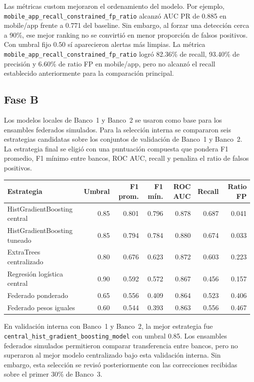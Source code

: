 \documentclass[10pt,a4paper]{article}
\begin{document}
Las métricas custom mejoraron el ordenamiento del modelo. Por ejemplo,
\texttt{mobile\_app\_recall\_constrained\_fp\_ratio} alcanzó AUC PR de 0.885 en
mobile/app frente a 0.771 del baseline. Sin embargo, al forzar una detección cerca
a 90\%, ese mejor ranking no se convirtió en menor proporción de falsos positivos.
Con umbral fijo 0.50 sí aparecieron alertas más limpias. La métrica
\texttt{mobile\_app\_recall\_constrained\_fp\_ratio} logró 82.36\% de recall,
93.40\% de precisión y 6.60\% de ratio FP en mobile/app, pero no alcanzó el recall
establecido anteriormente para la comparación principal.

\subsection{Fase B}

Los modelos locales de Banco~1 y Banco~2 se usaron como base para los ensambles federados
simulados. Para la selección interna  se compararon seis estrategias candidatas sobre los
conjuntos de validación de Banco~1 y Banco~2. La estrategia final se eligió con una
puntuación compuesta que pondera F1 promedio, F1 mínimo entre bancos, ROC AUC, recall
y penaliza el ratio de falsos positivos.

\begin{center}
\scriptsize
\begin{tabular}{p{}rrrrrr}
\toprule
\textbf{Estrategia} & \textbf{Umbral} & \textbf{F1 prom.} & \textbf{F1 mín.} & \textbf{ROC AUC} & \textbf{Recall} & \textbf{Ratio FP} \\
\midrule
HistGradientBoosting central & 0.85 & 0.801 & 0.796 & 0.878 & 0.687 & 0.041 \\
HistGradientBoosting tuneado & 0.85 & 0.794 & 0.784 & 0.880 & 0.674 & 0.033 \\
ExtraTrees centralizado & 0.80 & 0.676 & 0.623 & 0.872 & 0.603 & 0.223 \\
Regresión logística central & 0.90 & 0.592 & 0.572 & 0.867 & 0.456 & 0.157 \\
Federado ponderado & 0.65 & 0.556 & 0.409 & 0.864 & 0.523 & 0.406 \\
Federado pesos iguales & 0.60 & 0.544 & 0.393 & 0.863 & 0.556 & 0.467 \\
\bottomrule
\end{tabular}
\end{center}

En validación interna con Banco~1 y Banco~2, la mejor estrategia fue
\texttt{central\_hist\_gradient\_boosting\_model} con umbral 0.85. Los ensambles
federados simulados permitieron comparar transferencia entre bancos, pero no superaron
al mejor modelo centralizado bajo esta validación interna. Sin embargo, esta selección
se revisó posteriormente con las correcciones recibidas sobre el primer 30\% de Banco~3.
\end{document}
